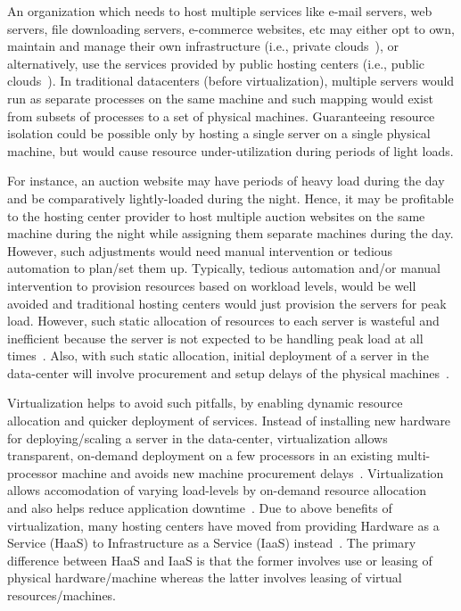 An organization which needs to host multiple services like e-mail servers,
web servers, file downloading servers, e-commerce websites, etc may either opt
to own, maintain and manage their own 
infrastructure (i.e., private 
clouds~\cite{ubuntu-private-cloud}), 
or alternatively, use the services provided by public hosting 
centers (i.e., public clouds~\cite{ec2}). 
In traditional datacenters (before virtualization), multiple
servers would run as separate processes on the same machine and such
mapping would exist from subsets of processes to a set of physical machines.
Guaranteeing resource isolation could be possible only by hosting a single
server on a single physical machine, but would 
cause resource under-utilization
during periods of light loads.

For instance, an auction website may have
periods of heavy load during the day and be comparatively lightly-loaded
during the night. Hence, it may be profitable to the hosting center provider to
host multiple auction websites on the same machine during the night while
assigning them separate machines during the day. However, such adjustments
would need manual intervention or tedious automation to plan/set them up.
Typically, tedious automation and/or manual intervention to provision 
resources based on workload levels, would be well avoided and traditional
hosting centers would just provision the servers for peak load.
However, such static allocation of resources to each server is wasteful
and inefficient because
the server is not expected to be handling peak load at all 
times~\cite{capacity-planning, emerging-research-directions}. Also, with
such static allocation, initial deployment of a server in the data-center
will involve procurement and setup delays of the physical 
machines~\cite{xen-art-of-virtualization}. 

Virtualization helps to avoid
such pitfalls, by enabling dynamic resource allocation and 
quicker deployment
of services. Instead of installing new hardware for deploying/scaling a server
in the data-center, virtualization 
allows transparent, on-demand deployment on a few
processors in an existing multi-processor machine and avoids new machine
procurement delays~\cite{xen-art-of-virtualization}. 
Virtualization allows accomodation of varying load-levels by
on-demand resource allocation~\cite{xen-art-of-virtualization-revisited}
and also helps reduce application downtime~\cite{google-live-migration}. 
Due to above benefits of virtualization, 
many hosting centers have moved from providing Hardware as a 
Service (HaaS)
to Infrastructure as a 
Service (IaaS) instead~\cite{ec2, azure}. 
The primary difference between HaaS and IaaS is that the 
former involves use or leasing of physical
hardware/machine whereas the latter involves 
leasing of virtual resources/machines.


